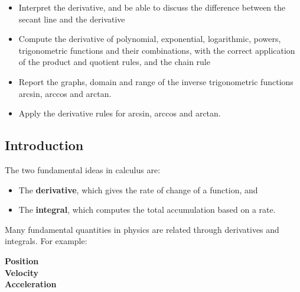 



\setfont
\pagestyle{fancy}
\renewcommand{\Week}{1 }
\renewcommand{\WeekTitle}{\WeekTitleOne }

\fancyhead[LE,RO]{Week \Week}  %
\fancyfoot{}
\sectionbox{Week \#\Week: \WeekTitle}


\vspace{5mm}
\goals
\begin{itemize}
\item Interpret the derivative, and be able to discuss the difference
  between the secant line and the derivative 
\item Compute the derivative of polynomial, exponential, logarithmic,
  powers, trigonometric functions and their combinations, with the
  correct application of the product and quotient rules, and the chain
  rule 
\item Report the graphs, domain and range of the inverse trigonometric
  functions arcsin, arccos and arctan.
\item Apply the derivative rules for arcsin, arccos and arctan.
 \end{itemize}

\vspace{5mm}

 
 
\newpage

\subsection*{Introduction}

The two fundamental ideas in calculus are:
\begin{itemize}
\item The {\bf derivative}, which gives the rate of change of a function, and \\[2ex]
\item The {\bf integral}, which computes the total accumulation based
  on a rate.
\end{itemize}

\newpage

Many fundamental quantities in physics are
related through derivatives and integrals.  For example: \\

\begin{center}
  {\bf Position} \\[10ex]
  {\bf Velocity} \\[10ex]
  {\bf Acceleration} 
\end{center}

